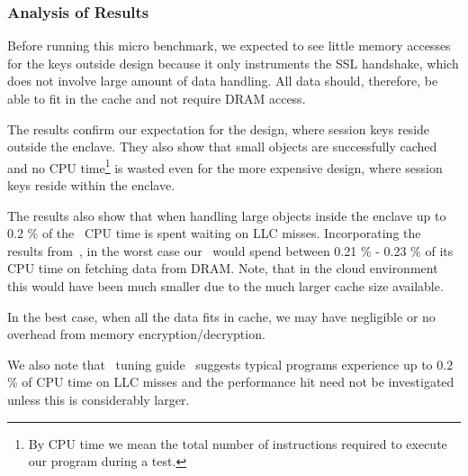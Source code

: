 \documentclass[../../../main.tex]{subfiles}
\begin{document}
\subsubsection*{Analysis of Results}
Before running this micro benchmark, we expected to see little memory
accesses for the keys outside design because it only instruments the SSL
handshake, which does not involve large amount of data handling. All data
should, therefore, be able to fit in the cache and not require DRAM access.

The results confirm our expectation for the design, where session keys reside
outside the enclave. They also show that small objects are successfully cached
and no CPU time\footnote{By CPU time we mean the total number of instructions
required to execute our program during a test.} is wasted even for the more
expensive design, where session keys reside within the enclave.

The results also show that when handling large objects inside the enclave up
to 0.2 \% of the \enclavemodel~CPU time is spent waiting on LLC misses.
Incorporating the results from~\cite{cryptoeprint:2016:204}, in the worst case
our \enclaveprogram~would spend between 0.21 \% - 0.23 \% of its CPU time on
fetching data from DRAM. Note, that in the cloud environment this would have
been much smaller due to the much larger cache size available.

In the best case, when all the data fits in cache, we may have negligible or
no overhead from memory encryption/decryption.

We also note that \Intel~tuning guide~\cite{intel-eqn} suggests typical
programs experience up to 0.2 \% of CPU time on LLC misses and the performance
hit need not be investigated unless this is considerably larger.
\end{document}
